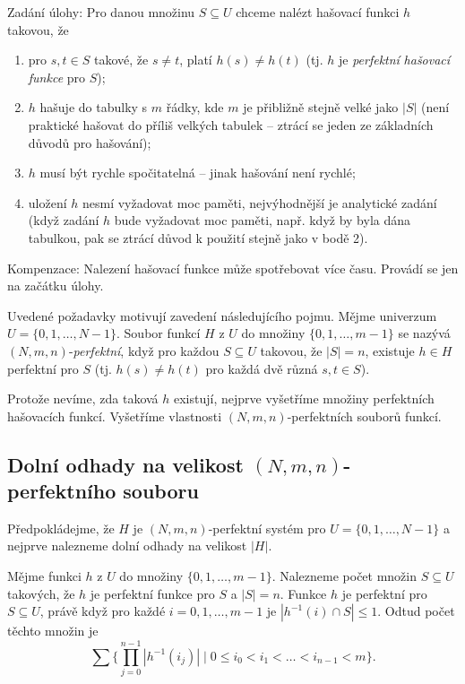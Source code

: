 \documentclass[a4paper,12pt]{article}
\begin{document}
Zadání úlohy: Pro danou množinu $S\subseteq 
U$ chceme 
nalézt hašo\-va\-cí funkci $h$ takovou, že
\begin{enumerate}
\item
pro $s,t\in S$ takové, že $s\ne t$, platí $h(s)\ne h(t)$ (tj. $
h$ je \emph{perfektní} \emph{hašovací} \emph{funkce} pro 
$S$); 
\item
$h$ hašuje do tabulky s $m$ řádky, kde $m$ je přibližně 
stejně velké jako $|S|$ (není praktické hašovat do příliš 
velkých tabulek -- ztrácí se jeden ze základních 
důvodů pro hašování); 
\item
$h$ musí být rychle spočitatelná -- jinak hašování 
není rychlé;
\item
uložení $h$ nesmí vyžadovat moc paměti, 
nejvýhodnější je ana\-lytické zadání (když zadání $
h$ bude 
vyžadovat moc paměti, např. když by byla dána tabulkou, 
pak se ztrácí důvod k použití stejně jako v 
bodě 2).
\end{enumerate}

Kompenzace: Nalezení hašovací funkce 
může spotřebovat více času. Provádí se jen na 
začátku úlohy. 

Uvedené požadavky motivují zavedení 
následujícího pojmu.\newline 
Mějme univerzum $U=\{0,1,\dots,N-1\}$. Soubor funkcí $H$ z 
$U$ do množiny $\{0,1,\dots,m-1\}$ se nazývá 
$(N,m,n)$-\emph{perfektní}, když pro každou $S\subseteq 
U$ 
takovou, že $|S|=n$, existuje $h\in H$ perfektní pro $S$ (tj. 
$h(s)\ne h(t)$ pro každá dvě různá $s,t\in S$).

Protože nevíme, zda taková $h$ existují, nejprve 
vyšetříme mno\-ži\-ny perfektních hašovacích 
funkcí. Vyšetříme vlastnosti $(N,m,n)$-perfektních 
souborů funkcí.

\subsection{
Dolní odhady na velikost $(N,m,n)$-perfektního souboru
}

Předpokládejme, že $H$  je $(N,m,n)$-perfektní 
systém pro $U=\{0,1,\dots,N-1\}$ a nejprve nalezneme dolní 
odhady na velikost $|H|$.

Mějme funkci $h$ z $U$ do množiny $\{0,1,\dots,m-
1\}$. 
Nalezneme počet množin $S\subseteq U$ takových, že  
$h$ je perfektní funkce pro $S$ a $|S|=n$. Funkce $h$ je perfektní pro 
$S\subseteq U$, právě když pro každé $i=0,1,\dots,m-
1$ je 
$|h^{-1}(i)\cap S|\le 1$. Odtud počet těchto množin je
$$\sum \{\prod_{j=0}^{n-1}|h^{-1}(i_j)|\mid 0\le i_0<i_1<\dots<i_{
n-1}<m\}.$$
\end{document}
